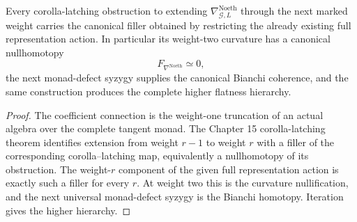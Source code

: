 \begin{theorem}
\label{thm:symmetry-noether-flatness-and-bianchi-hierarchy-of-noether-coefficient-connection}
Every corolla-latching obstruction to extending
$\nabla_{\mathcal G,L}^{\mathrm{Noeth}}$ through the next marked weight carries the
canonical filler obtained by restricting the already existing full representation
action.  In particular its weight-two curvature has a canonical nullhomotopy
\[
\boxed{F_{\nabla^{\mathrm{Noeth}}}\simeq0,}
\]
the next monad-defect syzygy supplies the canonical Bianchi coherence, and the same
construction produces the complete higher flatness hierarchy.
\end{theorem}

\begin{proof}
The coefficient connection is the weight-one truncation of an actual algebra over
the complete tangent monad.  The Chapter 15 corolla-latching theorem identifies
extension from weight $r-1$ to weight $r$ with a filler of the corresponding
corolla--latching map, equivalently a nullhomotopy of its obstruction.  The
weight-$r$ component of the given full representation action is exactly such a
filler for every $r$.  At weight two this is the curvature nullification, and the
next universal monad-defect syzygy is the Bianchi homotopy.  Iteration gives the
higher hierarchy.
\end{proof}

